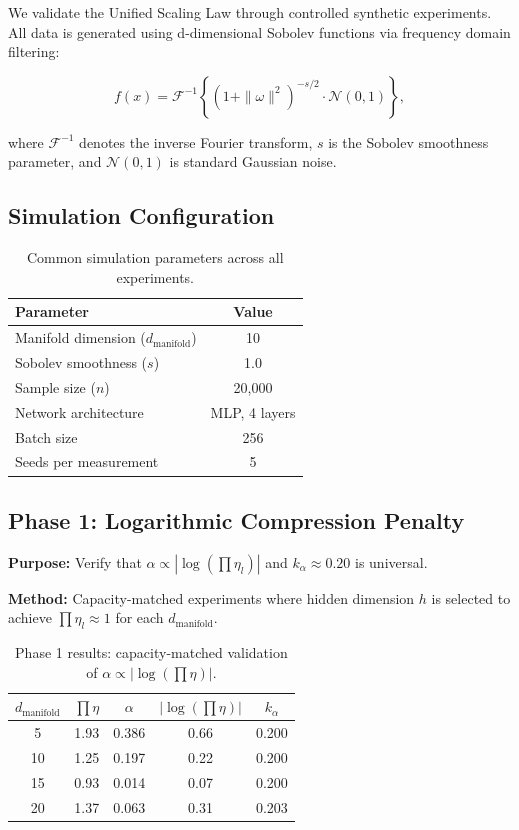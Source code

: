 \documentclass[11pt, a4paper]{article}
\theoremstyle{definition}
\begin{document}
We validate the Unified Scaling Law through controlled synthetic experiments. All data is generated using d-dimensional Sobolev functions via frequency domain filtering:

\begin{equation}
f(x) = \mathcal{F}^{-1}\left\{(1 + \|\omega\|^2)^{-s/2} \cdot \mathcal{N}(0,1)\right\},
\label{eq:sobolev_generation}
\end{equation}

where $\mathcal{F}^{-1}$ denotes the inverse Fourier transform, $s$ is the Sobolev smoothness parameter, and $\mathcal{N}(0,1)$ is standard Gaussian noise.

\subsection{Simulation Configuration}
\label{sec:simulation_config}

\begin{table}[htbp]
\centering
\caption{Common simulation parameters across all experiments.}
\label{tab:common_params}
\begin{tabular}{lc}
\toprule
\textbf{Parameter} & \textbf{Value} \\
\midrule
Manifold dimension ($d_{\text{manifold}}$) & 10 \\
Sobolev smoothness ($s$) & 1.0 \\
Sample size ($n$) & 20,000 \\
Network architecture & MLP, 4 layers \\
Batch size & 256 \\
Seeds per measurement & 5 \\
\bottomrule
\end{tabular}
\end{table}

\subsection{Phase 1: Logarithmic Compression Penalty}
\label{sec:phase1}

\textbf{Purpose:} Verify that $\alpha \propto |\log(\prod\eta_l)|$ and $k_\alpha \approx 0.20$ is universal.

\textbf{Method:} Capacity-matched experiments where hidden dimension $h$ is selected to achieve $\prod\eta_l \approx 1$ for each $d_{\text{manifold}}$.

\begin{table}[htbp]
\centering
\caption{Phase 1 results: capacity-matched validation of $\alpha \propto |\log(\prod\eta)|$.}
\label{tab:phase1_results}
\begin{tabular}{@{}ccccc@{}}
\toprule
$d_{\text{manifold}}$ & $\prod\eta$ & $\alpha$ & $|\log(\prod\eta)|$ & $k_\alpha$ \\
\midrule
5  & 1.93 & 0.386 & 0.66 & 0.200 \\
10 & 1.25 & 0.197 & 0.22 & 0.200 \\
15 & 0.93 & 0.014 & 0.07 & 0.200 \\
20 & 1.37 & 0.063 & 0.31 & 0.203 \\
\bottomrule
\end{tabular}
\end{table}
\end{document}
